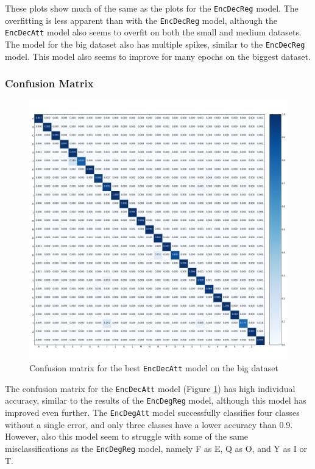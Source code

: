 These plots show much of the same as the plots for the {\tt EncDecReg} model. The overfitting is less apparent than with the {\tt EncDecReg} model, although the {\tt EncDecAtt} model also seems to overfit on both the small and medium datasets. The model for the big dataset also has multiple spikes, similar to the {\tt EncDecReg} model. This model also seems to improve for many epochs on the biggest dataset.

\newpage
\subsubsection{Confusion Matrix}
\begin{figure}[H]
    \centering
    \includegraphics[width=1\textwidth]{fig/results/experiment1/big/encdecatt/confusion_matrix.png}
    \caption{Confusion matrix for the best {\tt EncDecAtt} model on the big dataset}
    \label{fig:result1_big_encdecatt_confusion_matrix}
\end{figure}

The confusion matrix for the {\tt EncDecAtt} model (Figure \ref{fig:result1_big_encdecatt_confusion_matrix}) has high individual accuracy, similar to the results of the {\tt EncDegReg} model, although this model has improved even further. The {\tt EncDegAtt} model successfully classifies four classes without a single error, and only three classes have a lower accuracy than 0.9. However, also this model seem to struggle with some of the same misclassifications as the {\tt EncDegReg} model, namely F as E, Q as O, and Y as I or T.


